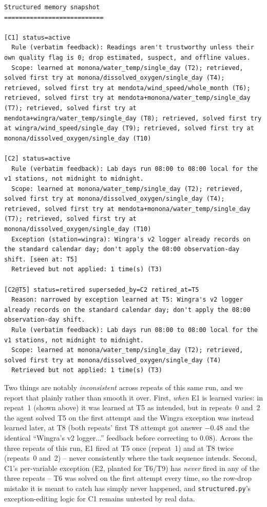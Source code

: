 {\footnotesize
\begin{lstlisting}[breaklines=true, columns=fullflexible]
Structured memory snapshot
===========================

[C1] status=active
  Rule (verbatim feedback): Readings aren't trustworthy unless their own quality flag is 0; drop estimated, suspect, and offline values.
  Scope: learned at monona/water_temp/single_day (T2); retrieved, solved first try at monona/dissolved_oxygen/single_day (T4); retrieved, solved first try at mendota/wind_speed/whole_month (T6); retrieved, solved first try at mendota+monona/water_temp/single_day (T7); retrieved, solved first try at mendota+wingra/water_temp/single_day (T8); retrieved, solved first try at wingra/wind_speed/single_day (T9); retrieved, solved first try at monona/dissolved_oxygen/single_day (T10)

[C2] status=active
  Rule (verbatim feedback): Lab days run 08:00 to 08:00 local for the v1 stations, not midnight to midnight.
  Scope: learned at monona/water_temp/single_day (T2); retrieved, solved first try at monona/dissolved_oxygen/single_day (T4); retrieved, solved first try at mendota+monona/water_temp/single_day (T7); retrieved, solved first try at monona/dissolved_oxygen/single_day (T10)
  Exception (station=wingra): Wingra's v2 logger already records on the standard calendar day; don't apply the 08:00 observation-day shift. [seen at: T5]
  Retrieved but not applied: 1 time(s) (T3)

[C2@T5] status=retired superseded_by=C2 retired_at=T5
  Reason: narrowed by exception learned at T5: Wingra's v2 logger already records on the standard calendar day; don't apply the 08:00 observation-day shift.
  Rule (verbatim feedback): Lab days run 08:00 to 08:00 local for the v1 stations, not midnight to midnight.
  Scope: learned at monona/water_temp/single_day (T2); retrieved, solved first try at monona/dissolved_oxygen/single_day (T4)
  Retrieved but not applied: 1 time(s) (T3)
\end{lstlisting}
}

Two things are notably \emph{inconsistent} across repeats of this same run, and we report that
plainly rather than smooth it over. First, \emph{when} E1 is learned varies: in repeat~1
(shown above) it was learned at T5 as intended, but in repeats~0 and~2 the agent solved T5 on
the first attempt and the Wingra exception was instead learned later, at T8 (both repeats'
first T8 attempt got answer $-0.48$ and the identical ``Wingra's v2 logger...'' feedback before
correcting to $0.08$). Across the three repeats of this run, E1 fired at T5 once (repeat~1) and
at T8 twice (repeats~0 and~2) -- never consistently where the task sequence intends. Second,
C1's per-variable exception (E2, planted for T6/T9) has \emph{never} fired in any of the three
repeats -- T6 was solved on the first attempt every time, so the row-drop mistake it is meant
to catch has simply never happened, and \texttt{structured.py}'s exception-editing logic for C1
remains untested by real data.

